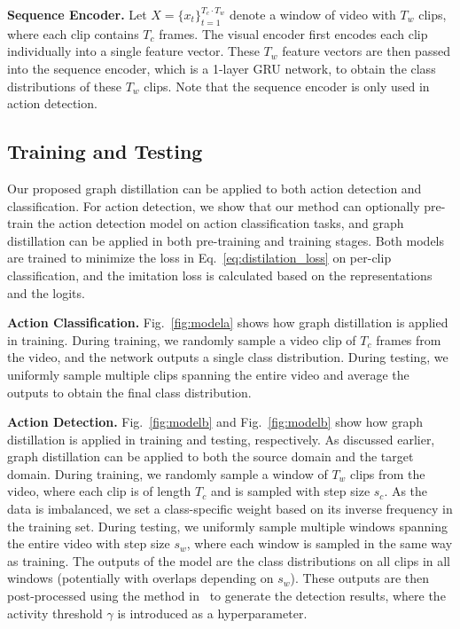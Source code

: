 \noindent\textbf{Sequence Encoder.} Let $X = \{x_t\}_{t=1}^{T_c\cdot T_w}$ denote a window of video with $T_w$ clips, where each clip contains $T_c$ frames. The visual encoder first encodes each clip individually into a single feature vector. These $T_w$ feature vectors are then passed into the sequence encoder, which is a 1-layer GRU network, to obtain the class distributions of these $T_w$ clips. Note that the sequence encoder is only used in action detection.



\subsection{Training and Testing}

Our proposed graph distillation can be applied to both action detection and classification. For action detection, we show that our method can optionally pre-train the action detection model on action classification tasks, and graph distillation can be applied in both pre-training and training stages. Both models are trained to minimize the loss in Eq.~\eqref{eq:distilation_loss} on per-clip classification, and the imitation loss is calculated based on the representations and the logits. 

\noindent\textbf{Action Classification.}
Fig.~\ref{fig:modela} shows how graph distillation is applied in training. During training, we randomly sample a video clip of $T_c$ frames from the video, and the network outputs a single class distribution. During testing, we uniformly sample multiple clips spanning the entire video and average the outputs to obtain the final class distribution.

\noindent\textbf{Action Detection.}
Fig.~\ref{fig:modelb} and Fig.~\ref{fig:modelb} show how graph distillation is applied in training and testing, respectively. As discussed earlier, graph distillation can be applied to both the source domain and the target domain. During training, we randomly sample a window of $T_w$ clips from the video, where each clip is of length $T_c$ and is sampled with step size $s_c$. As the data is imbalanced, we set a class-specific weight based on its inverse frequency in the training set. During testing, we uniformly sample multiple windows spanning the entire video with step size $s_w$, where each window is sampled in the same way as training. The outputs of the model are the class distributions on all clips in all windows (potentially with overlaps depending on $s_w$). These outputs are then post-processed using the method in~\cite{montes2016temporal} to generate the detection results, where the activity threshold $\gamma$ is introduced as a hyperparameter.


